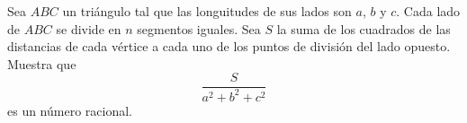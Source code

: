 Sea $ABC$ un triángulo tal que las longuitudes de sus lados son $a$, $b$ y $c$. Cada lado de $ABC$ se divide en $n$ segmentos iguales. Sea $S$ la suma de los cuadrados de las distancias de cada vértice a cada uno de los puntos de división del lado opuesto. Muestra que
\[\frac{S}{a^2+b^2+c^2}\]
es un número racional.